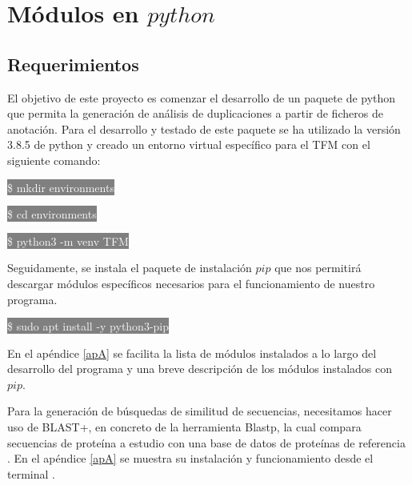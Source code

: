 \section{Módulos en $python$}

\subsection{Requerimientos}

El objetivo de este proyecto es comenzar el desarrollo de un paquete de python que permita la generación de análisis de duplicaciones a partir de ficheros de anotación. Para el desarrollo y testado de este paquete se ha utilizado la versión 3.8.5 de python y creado un entorno virtual específico para el TFM con el siguiente comando:



\vspace{5mm}

\colorbox{gray}{\textcolor{white}{\$ mkdir environments}}

\colorbox{gray}{\textcolor{white}{\$ cd environments}}

\colorbox{gray}{\textcolor{white}{\$ python3 -m venv TFM}}    

\vspace{5mm} %

Seguidamente, se instala el paquete de instalación $pip$ que nos permitirá descargar módulos específicos necesarios para el funcionamiento de nuestro programa.

\vspace{3mm}
\colorbox{gray}{\textcolor{white}{\$ sudo apt install -y python3-pip}}
\vspace{3mm}

En el apéndice \ref{apA} se facilita la lista de módulos instalados a lo largo del desarrollo del programa y una breve descripción de los módulos instalados con $pip$.

Para la generación de búsquedas de similitud de secuencias, necesitamos hacer uso de BLAST+, en concreto de la herramienta Blastp, la cual compara secuencias de proteína a estudio con una base de datos de proteínas de referencia \cite{bethesda_md_national_library_of_medicine_us_blast_nodate,altschul_basic_1990}. En el apéndice \ref{apA} se muestra su instalación y funcionamiento desde el terminal \cite{bethesda_md_national_center_for_biotechnology_information_us_blast_2008}.

